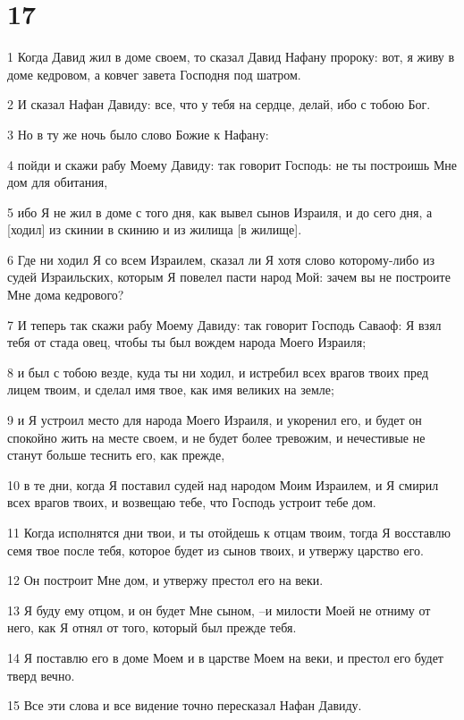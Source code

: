\chapter{17}

\par 1 Когда Давид жил в доме своем, то сказал Давид Нафану пророку: вот, я живу в доме кедровом, а ковчег завета Господня под шатром.
\par 2 И сказал Нафан Давиду: все, что у тебя на сердце, делай, ибо с тобою Бог.
\par 3 Но в ту же ночь было слово Божие к Нафану:
\par 4 пойди и скажи рабу Моему Давиду: так говорит Господь: не ты построишь Мне дом для обитания,
\par 5 ибо Я не жил в доме с того дня, как вывел сынов Израиля, и до сего дня, а [ходил] из скинии в скинию и из жилища [в жилище].
\par 6 Где ни ходил Я со всем Израилем, сказал ли Я хотя слово которому-либо из судей Израильских, которым Я повелел пасти народ Мой: зачем вы не построите Мне дома кедрового?
\par 7 И теперь так скажи рабу Моему Давиду: так говорит Господь Саваоф: Я взял тебя от стада овец, чтобы ты был вождем народа Моего Израиля;
\par 8 и был с тобою везде, куда ты ни ходил, и истребил всех врагов твоих пред лицем твоим, и сделал имя твое, как имя великих на земле;
\par 9 и Я устроил место для народа Моего Израиля, и укоренил его, и будет он спокойно жить на месте своем, и не будет более тревожим, и нечестивые не станут больше теснить его, как прежде,
\par 10 в те дни, когда Я поставил судей над народом Моим Израилем, и Я смирил всех врагов твоих, и возвещаю тебе, что Господь устроит тебе дом.
\par 11 Когда исполнятся дни твои, и ты отойдешь к отцам твоим, тогда Я восставлю семя твое после тебя, которое будет из сынов твоих, и утвержу царство его.
\par 12 Он построит Мне дом, и утвержу престол его на веки.
\par 13 Я буду ему отцом, и он будет Мне сыном, --и милости Моей не отниму от него, как Я отнял от того, который был прежде тебя.
\par 14 Я поставлю его в доме Моем и в царстве Моем на веки, и престол его будет тверд вечно.
\par 15 Все эти слова и все видение точно пересказал Нафан Давиду.
